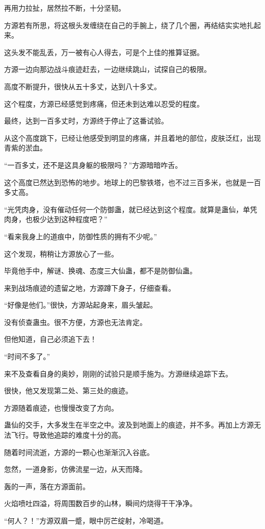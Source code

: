 \begin{this_body}
再用力拉扯，居然拉不断，十分坚韧。

方源若有所思，将这根头发缠绕在自己的手腕上，绕了几个圈，再结结实实地扎起来。

这头发不能乱丢，万一被有心人得去，可是个上佳的推算证据。

方源一边向那边战斗痕迹赶去，一边继续跳山，试探自己的极限。

高度不断提升，很快从五十多丈，达到八十多丈。

这个程度，方源已经感觉到疼痛，但还未到达难以忍受的程度。

最终，达到一百多丈时，方源终于停止了这番试验。

从这个高度跳下，已经让他感受到明显的疼痛，并且着地的部位，皮肤泛红，出现青紫的淤血。

“一百多丈，还不是这具身躯的极限吗？”方源暗暗咋舌。

这个高度已然达到恐怖的地步。地球上的巴黎铁塔，也不过三百多米，也就是一百多丈高。

“光凭肉身，没有催动任何一个防御蛊，就已经达到这个程度。就算是蛊仙，单凭肉身，也极少达到这种程度吧？”

“看来我身上的道痕中，防御性质的拥有不少呢。”

这个发现，稍稍让方源放心了一些。

毕竟他手中，解谜、换魂、态度三大仙蛊，都不是防御仙蛊。

来到战场痕迹的遗留之地，方源蹲下身子，仔细查看。

“好像是他们。”很快，方源站起身来，眉头皱起。

没有侦查蛊虫。很不方便，方源也无法肯定。

但他知道，自己必须追下去！

“时间不多了。”

来不及查看自身的奥妙，刚刚的试验只是顺手施为。方源继续追踪下去。

很快，他又发现第二处、第三处的痕迹。

方源随着痕迹，也慢慢改变了方向。

蛊仙的交手，大多发生在半空之中。波及到地面上的痕迹，并不多。再加上方源无法飞行。导致他追踪的难度十分的高。

随着时间流逝，方源的一颗心也渐渐沉入谷底。

忽然，一道身影，仿佛流星一边，从天而降。

轰的一声，落在方源面前。

火焰喷吐四溢，将周围数百步的山林，瞬间灼烧得干干净净。

“何人？！”方源双眉一蹙，眼中厉芒绽射，冷喝道。


\end{this_body}
